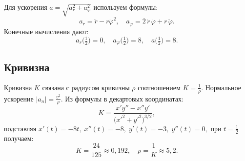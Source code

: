 Для ускорения \(a = \sqrt{a_r^2 + a_\varphi^2}\) используем формулы:
\[
a_r = \ddot{r} - r \dot{\varphi}^2,
\quad
a_\varphi = 2\,\dot{r}\,\dot{\varphi} + r\,\ddot{\varphi}.
\]
Конечные вычисления дают:
\[
a_r\bigl(\tfrac12\bigr) = 0,
\quad
a_\varphi\bigl(\tfrac12\bigr) = 8,
\quad
a\bigl(\tfrac12\bigr) = 8.
\]

\subsection{Кривизна}

Кривизна \(K\) связана с радиусом кривизны \(\rho\) соотношением \(K = \tfrac{1}{\rho}\).  
Нормальное ускорение \(\lvert a_n \rvert = \tfrac{v^2}{\rho}\).  
Из формулы в декартовых координатах:
\[
K 
= \frac{x'y'' - x''y'}{\bigl(x'^2 + y'^2\bigr)^{3/2}},
\]
подставляя \(x'(t)=-8t,\; x''(t)=-8,\; y'(t)=-3,\; y''(t)=0,\) при \(t=\tfrac12\) получаем:
\[
K = \frac{24}{125} \approx 0{,}192,
\quad
\rho = \frac{1}{K} \approx 5{,}2.
\]
